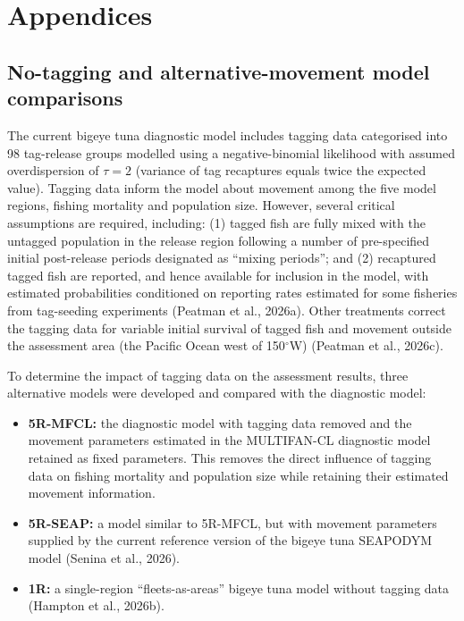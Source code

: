 \documentclass[
  english,
  a4paper,
  a4paper,
  11pt]{SCreport}
\begin{document}
\appendix
\setcounter{figure}{0}
\renewcommand{\thefigure}{A\arabic{figure}}
\setcounter{table}{0}
\renewcommand{\thetable}{A\arabic{table}}

\section{Appendices}\label{sec-appendices}

\subsection{No-tagging and alternative-movement model
comparisons}\label{sec-appendix-no-tag-movement}

The current bigeye tuna diagnostic model includes tagging data
categorised into 98 tag-release groups modelled using a
negative-binomial likelihood with assumed overdispersion of \(\tau=2\)
(variance of tag recaptures equals twice the expected value). Tagging
data inform the model about movement among the five model regions,
fishing mortality and population size. However, several critical
assumptions are required, including: (1) tagged fish are fully mixed
with the untagged population in the release region following a number of
pre-specified initial post-release periods designated as ``mixing
periods''; and (2) recaptured tagged fish are reported, and hence
available for inclusion in the model, with estimated probabilities
conditioned on reporting rates estimated for some fisheries from
tag-seeding experiments (Peatman et al., 2026a). Other treatments
correct the tagging data for variable initial survival of tagged fish
and movement outside the assessment area (the Pacific Ocean west of
150\(^\circ\)W) (Peatman et al., 2026c).

To determine the impact of tagging data on the assessment results, three
alternative models were developed and compared with the diagnostic
model:

\begin{itemize}
\item
  \textbf{5R-MFCL:} the diagnostic model with tagging data removed and
  the movement parameters estimated in the MULTIFAN-CL diagnostic model
  retained as fixed parameters. This removes the direct influence of
  tagging data on fishing mortality and population size while retaining
  their estimated movement information.
\item
  \textbf{5R-SEAP:} a model similar to 5R-MFCL, but with movement
  parameters supplied by the current reference version of the bigeye
  tuna SEAPODYM model (Senina et al., 2026).
\item
  \textbf{1R:} a single-region ``fleets-as-areas'' bigeye tuna model
  without tagging data (Hampton et al., 2026b).
\end{itemize}
\end{document}
